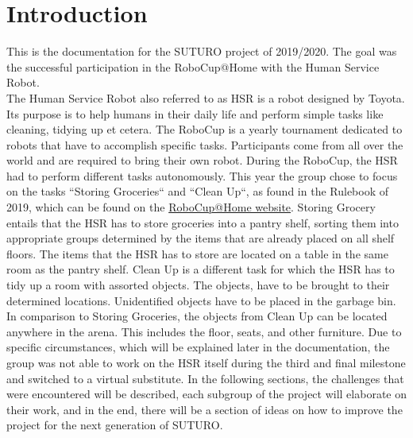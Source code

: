 \documentclass[main.tex]{subfiles}
\begin{document}
	\chapter{Introduction}
	\label{introduction}
	
	This is the documentation for the SUTURO project of 2019/2020. The goal was the successful participation in the RoboCup@Home with the Human Service Robot. \\
	The Human Service Robot also referred to as HSR is a robot designed by Toyota. Its purpose is to help humans in their daily life and perform simple tasks like cleaning, tidying up et cetera. The RoboCup is a yearly tournament dedicated to robots that have to accomplish specific tasks. Participants come from all over the world and are required to bring their own robot.
During the RoboCup, the HSR had to perform different tasks autonomously.
This year the group chose to focus on the tasks “Storing Groceries“ and “Clean Up“, as found in the Rulebook of 2019, which can be found on the \href{http://www.robocupathome.org/rules}{RoboCup@Home website}. 
	Storing Grocery entails that the HSR has to store groceries into a pantry shelf, sorting them into appropriate groups determined by the items that are already placed on all shelf floors. The items that the HSR has to store are located on a table in the same room as the pantry shelf.
Clean Up is a different task for which the HSR has to tidy up a room with assorted objects. The objects, have to be brought to their determined locations. Unidentified objects have to be placed in the garbage bin. In comparison to Storing Groceries, the objects from Clean Up can be located anywhere in the arena. This includes the floor, seats, and other furniture.
Due to specific circumstances, which will be explained later in the documentation, the group was not able to work on the HSR itself during the third and final milestone and switched to a virtual substitute.
	In the following sections, the challenges that were encountered will be described, each subgroup of the project will elaborate on their work, and in the end, there will be a section of ideas on how to improve the project for the next generation of SUTURO.
	
\end{document}
